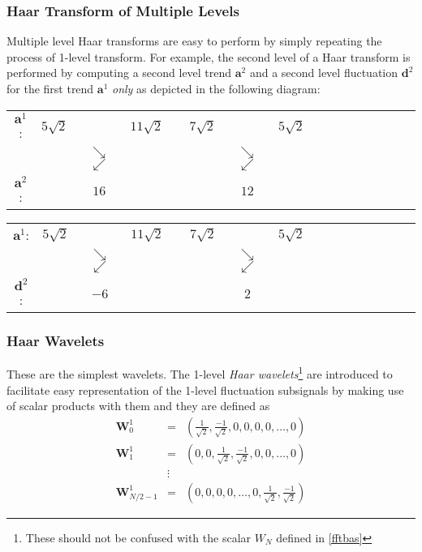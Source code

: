 \documentclass[a4paper,11pt]{article}
\begin{document}
\subsubsection*{Haar Transform of Multiple Levels}
Multiple level Haar transforms are easy to perform by simply repeating the process of 1-level transform. For example, the second level of a Haar transform is performed by computing a second level trend $\mathbf{a}^{2}$ and a second level fluctuation $\mathbf{d}^{2}$ for the first trend $\mathbf{a}^{1}$ \emph{only} as depicted in the following diagram:
\begin{center}
\begin{tabular}{cccccccccccccccc}
$\mathbf{a}^{1}$: & $5\sqrt{2}$ & & $11\sqrt{2}$ & & $7\sqrt{2}$ & & $5\sqrt{2}$   \\
 &   & $\searrow$$\swarrow$ & & & & $\searrow$$\swarrow$ &  \\
$\mathbf{a}^{2}$: & & $16$ & & & & $12$ &    
\end{tabular}
\end{center}

\begin{center}
\begin{tabular}{cccccccccccccccc}
$\mathbf{a}^{1}$: & $5\sqrt{2}$ & & $11\sqrt{2}$ & & $7\sqrt{2}$ & & $5\sqrt{2}$   \\
 &   & $\searrow$$\swarrow$ & & & & $\searrow$$\swarrow$ &  \\
$\mathbf{d}^{2}$: & & $-6$ & & & & $2$ &    
\end{tabular}
\end{center}

\subsubsection{Haar Wavelets}
These are the simplest wavelets. The 1-level \emph{Haar wavelets}\footnote{These should not be confused with the scalar $W_{N}$ defined in \ref{fftbas}} are introduced to facilitate easy representation of the 1-level fluctuation subsignals by making use of scalar products with them and they are defined as
\begin{eqnarray}
\mathbf{W}_{0}^{1} & = &\left( \frac{1}{\sqrt{2}},\frac{-1}{\sqrt{2}},0,0,0,0,\ldots,0 \right) \nonumber \\
\mathbf{W}_{1}^{1} & = & \left( 0,0,\frac{1}{\sqrt{2}},\frac{-1}{\sqrt{2}},0,0,\ldots,0 \right) \nonumber \\
	 & \vdots & 	\nonumber \\
\mathbf{W}_{N/2-1}^{1} & = & \left( 0,0,0,0,\ldots,0,\frac{1}{\sqrt{2}},\frac{-1}{\sqrt{2}} \right) 
\end{eqnarray}
\end{document}

